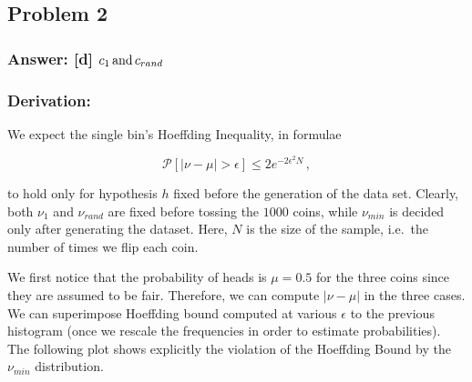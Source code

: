 \documentclass[11pt]{article}
\begin{document}
    \hypertarget{problem-2}{%
\subsection{Problem 2}\label{problem-2}}

\hypertarget{answer-d-c_1-rm-and-c_rand}{%
\subsubsection{\texorpdfstring{Answer: {[}d{]}
\(c_1 \, {\rm and}\, c_{rand}\)}{Answer: {[}d{]} c\_1 \textbackslash{}, \{\textbackslash{}rm and\}\textbackslash{}, c\_\{rand\}}}\label{answer-d-c_1-rm-and-c_rand}}

\hypertarget{derivation}{%
\subsubsection{Derivation:}\label{derivation}}

We expect the single bin's Hoeffding Inequality, in formulae

\[
\mathcal{P}[|\nu-\mu|>\epsilon]\le 2 e^{-2\epsilon^2 N}\,,
\]

to hold only for hypothesis \(h\) fixed before the generation of the
data set. Clearly, both \(\nu_{1}\) and \(\nu_{rand}\) are fixed before
tossing the \(1000\) coins, while \(\nu_{min}\) is decided only after
generating the dataset. Here, \(N\) is the size of the sample, i.e.~the
number of times we flip each coin.

We first notice that the probability of heads is \(\mu=0.5\) for the
three coins since they are assumed to be fair. Therefore, we can compute
\(|\nu-\mu|\) in the three cases. We can superimpose Hoeffding bound
computed at various \(\epsilon\) to the previous histogram (once we
rescale the frequencies in order to estimate probabilities). The
following plot shows explicitly the violation of the Hoeffding Bound by
the \(\nu_{min}\) distribution.
\end{document}
